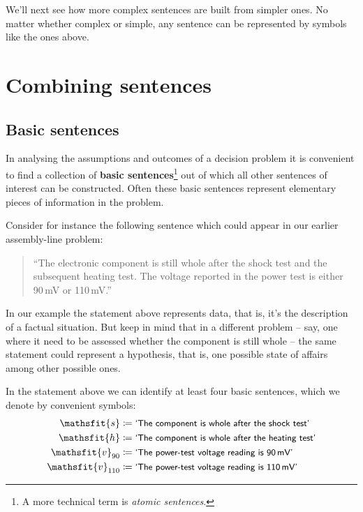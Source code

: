 \documentclass[
  a4paper,
  DIV=11,
  numbers=noendperiod,
  oneside]{scrreprt}
\begin{document}
We'll next see how more complex sentences are built from simpler ones.
No matter whether complex or simple, any sentence can be represented by
symbols like the ones above.

\hypertarget{combining-sentences}{%
\section{Combining sentences}\label{combining-sentences}}

\hypertarget{basic-sentences}{%
\subsection{Basic sentences}\label{basic-sentences}}

In analysing the assumptions and outcomes of a decision problem it is
convenient to find a collection of {\textbf{basic sentences}}\footnote{A
  more technical term is \emph{atomic sentences}.} out of which all
other sentences of interest can be constructed. Often these basic
sentences represent elementary pieces of information in the problem.

Consider for instance the following sentence which could appear in our
earlier assembly-line problem:

\begin{quote}
``The electronic component is still whole after the shock test and the
subsequent heating test. The voltage reported in the power test is
either 90\,mV or 110\,mV.''
\end{quote}

In our example the statement above represents data, that is, it's the
description of a factual situation. But keep in mind that in a different
problem -- say, one where it need to be assessed whether the component
is still whole -- the same statement could represent a hypothesis, that
is, one possible state of affairs among other possible ones.

In the statement above we can identify at least four basic sentences,
which we denote by convenient symbols: \begin{align*}
\mathsfit{s} &\coloneqq \textsf{\small`The component is whole after the shock test'}
\\
\mathsfit{h} &\coloneqq \textsf{\small`The component is whole after the heating test'}
\\
\mathsfit{v}_{90} &\coloneqq \textsf{\small`The power-test voltage reading is 90\,mV'}
\\
\mathsfit{v}_{110} &\coloneqq \textsf{\small`The power-test voltage reading is 110\,mV'}
\end{align*}
\end{document}
